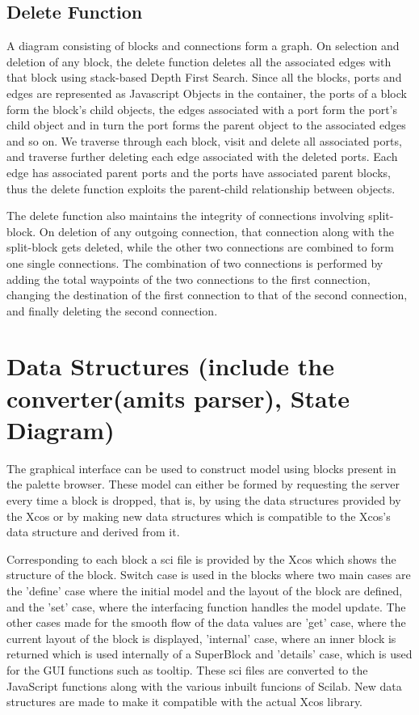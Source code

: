 \documentclass[conference]{IEEEtran}
\begin{document}
\subsection{Delete Function}

A diagram consisting of blocks and connections form a graph. On selection and deletion of any block, the delete function deletes all the associated edges with that block using stack-based Depth First Search. Since all the blocks, ports and edges are represented as Javascript Objects in the container, the ports of a block form the block's child objects, the edges associated with a port form the port's child object and in turn the port forms the parent object to the associated edges and so on. We traverse through each block, visit and delete all associated ports, and traverse further deleting each edge associated with the deleted ports. Each edge has associated parent ports and the ports have associated parent blocks, thus the delete function exploits the parent-child relationship between objects.

The delete function also maintains the integrity of connections involving split-block.
On deletion of any outgoing connection, that connection along with the split-block gets deleted, while the other two connections are combined to form one single connections. The combination of two connections is performed by adding the total waypoints of the two connections to the first connection, changing the destination of the first connection to that of the second connection, and finally deleting the second connection.

\section{Data Structures (include the converter(amits parser), State Diagram)}
The graphical interface can be used to construct model using blocks present in the palette browser. These model can either be formed by requesting the server every time a block is dropped, that is, by using the data structures provided by the Xcos or by making new data structures which is compatible to the Xcos's data structure and derived from it. 

Corresponding to each block a sci file is provided by the Xcos which shows the structure of the block. Switch case is used in the blocks where two main cases are the 'define' case where the initial model and the layout of the block are defined, and the 'set' case, where the interfacing function handles the model update. The other cases made for the smooth flow of the data values are 'get' case, where the current layout of the block is displayed, 'internal' case, where an inner block is returned which is used internally of a SuperBlock and 'details' case, which is used for the GUI functions such as tooltip. These sci files are converted to the JavaScript functions along with the various inbuilt funcions of Scilab. New data structures are made to make it compatible with the actual Xcos library.
\end{document}

